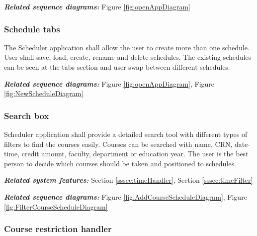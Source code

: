 \documentclass[twoside,letterpaper]{article}
\begin{document}
\smallskip

{\color{black}
\emph{\textbf{Related sequence diagrams:}} Figure \ref{fig:openAppDiagram}}

\subsubsection[Schedule tabs
]{\rmfamily\bfseries\color{black}
	Schedule tabs}

{\color{black}
	The Scheduler application shall allow the user to create more than one schedule. User shall save, load, create, rename and delete schedules. The existing schedules can be seen at the tabs section and user swap between different schedules.}
	
\smallskip

{\color{black}
\emph{\textbf{Related sequence diagrams:}} Figure \ref{fig:openAppDiagram}, Figure \ref{fig:NewScheduleDiagram}}

\subsubsection[Search box
]{\rmfamily\bfseries\color{black}
	Search box}

{\color{black}
	Scheduler application shall provide a detailed search tool with different types of filters to find the courses easily. Courses can be searched with name, CRN, date-time, credit amount, faculty, department or education year. The user is the best person to decide which courses should be taken and positioned to schedules.}
	
\smallskip

{\color{black}
\emph{\textbf{Related system features:}} Section \ref{sssec:timeHandler}, Section \ref{sssec:timeFilter}}
	
\smallskip

{\color{black}
\emph{\textbf{Related sequence diagrams:}} Figure \ref{fig:AddCourseScheduleDiagram}, Figure \ref{fig:FilterCourseScheduleDiagram}}

\subsubsection[Course restriction handler]{\rmfamily\bfseries\color{black}
	Course restriction handler}
\end{document}

